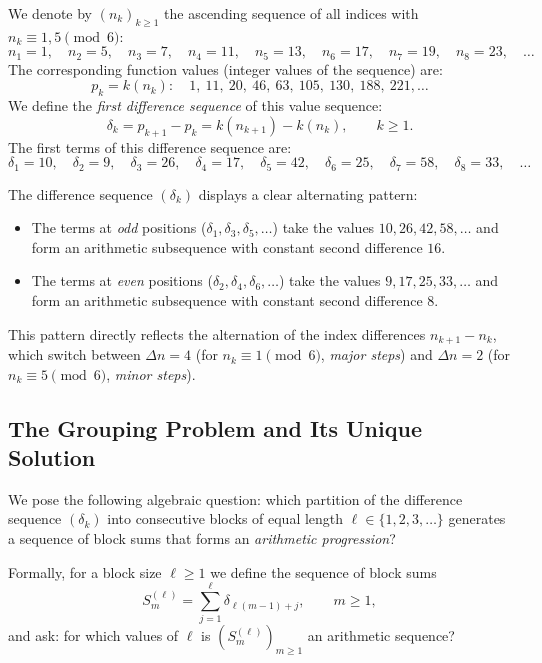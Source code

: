 We denote by $(n_k)_{k \geq 1}$ the ascending sequence of all
indices with $n_k \equiv 1, 5 \pmod{6}$:
\[
  n_1 = 1,\quad n_2 = 5,\quad n_3 = 7,\quad n_4 = 11,\quad
  n_5 = 13,\quad n_6 = 17,\quad n_7 = 19,\quad n_8 = 23,\quad \ldots
\]
The corresponding function values (integer values of the sequence) are:
\[
  p_k = k(n_k)\colon\quad 1,\ 11,\ 20,\ 46,\ 63,\ 105,\ 130,\ 188,\ 221,\ldots
\]
We define the \emph{first difference sequence} of this value sequence:
\[
  \delta_k = p_{k+1} - p_k = k(n_{k+1}) - k(n_k),\qquad k \geq 1.
\]
The first terms of this difference sequence are:
\[
  \delta_1 = 10,\quad \delta_2 = 9,\quad \delta_3 = 26,\quad
  \delta_4 = 17,\quad \delta_5 = 42,\quad \delta_6 = 25,\quad
  \delta_7 = 58,\quad \delta_8 = 33,\quad \ldots
\]

\begin{bemerkung}
The difference sequence $(\delta_k)$ displays a clear alternating pattern:
\begin{itemize}
  \item The terms at \emph{odd} positions ($\delta_1, \delta_3, \delta_5, \ldots$)
        take the values $10, 26, 42, 58, \ldots$ and form an arithmetic subsequence
        with constant second difference $16$.
  \item The terms at \emph{even} positions ($\delta_2, \delta_4, \delta_6, \ldots$)
        take the values $9, 17, 25, 33, \ldots$ and form an arithmetic subsequence
        with constant second difference $8$.
\end{itemize}
This pattern directly reflects the alternation of the index differences $n_{k+1} - n_k$,
which switch between $\Delta n = 4$ (for $n_k \equiv 1 \pmod{6}$, \emph{major steps})
and $\Delta n = 2$ (for $n_k \equiv 5 \pmod{6}$, \emph{minor steps}).
\end{bemerkung}

\subsection{The Grouping Problem and Its Unique Solution}
\label{subsec:gruppenbildung}

We pose the following algebraic question: which partition of the
difference sequence $(\delta_k)$ into consecutive blocks of equal length
$\ell \in \{1, 2, 3, \ldots\}$ generates a sequence of block sums
that forms an \emph{arithmetic progression}?

Formally, for a block size $\ell \geq 1$ we define the sequence of
block sums
\[
  S_m^{(\ell)} = \sum_{j=1}^{\ell} \delta_{\ell(m-1)+j},\qquad m \geq 1,
\]
and ask: for which values of $\ell$ is $(S_m^{(\ell)})_{m \geq 1}$
an arithmetic sequence?

